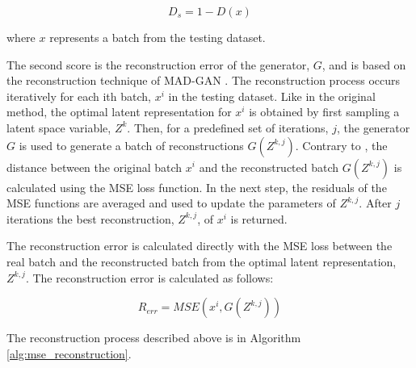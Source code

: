 \begin{equation}
    D_{s} = 1 - D(x)
\end{equation}

where $x$ represents a batch from the testing dataset.

The second score is the reconstruction error of the generator, $G$, and is based on the reconstruction technique of MAD-GAN \cite{li.etal_MADGANMultivariateAnomaly_2019}. The reconstruction process occurs iteratively for each ith batch, $x^i$ in the testing dataset. Like in the original method, the optimal latent representation for $x^i$ is obtained by first sampling a latent space variable, $Z^k$. Then, for a predefined set of iterations, $j$, the generator $G$ is used to generate a batch of reconstructions $G(Z^{k,j})$. Contrary to \cite{li.etal_MADGANMultivariateAnomaly_2019}, the distance between the original batch $x^i$ and the reconstructed batch $G(Z^{k,j})$ is calculated using the MSE loss function. In the next step, the residuals of the MSE functions are averaged and used to update the parameters of $Z^{k,j}$. After $j$ iterations the best reconstruction, $Z^{k,j}$, of $x^i$ is returned.

The reconstruction error is calculated directly with the MSE loss between the real batch and the reconstructed batch from the optimal latent representation, $Z^{k,j}$. The reconstruction error is calculated as follows:

\begin{equation}
    R_{err} = MSE(x^i, G(Z^{k,j}))
\end{equation}

The reconstruction process described above is in Algorithm \ref{alg:mse_reconstruction}.
\\

\noindent{}

